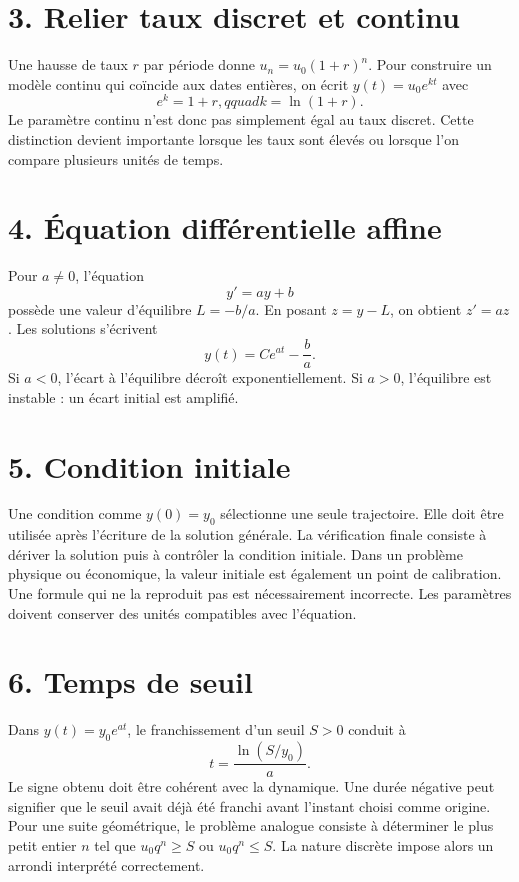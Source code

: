 \section{3. Relier taux discret et continu}
Une hausse de taux $r$ par période donne $u_n=u_0(1+r)^n$. Pour construire un modèle continu qui coïncide aux dates entières, on écrit $y(t)=u_0e^{kt}$ avec
\[
e^k=1+r,qquad k=\ln(1+r).
\]
Le paramètre continu n'est donc pas simplement égal au taux discret. Cette distinction devient importante lorsque les taux sont élevés ou lorsque l'on compare plusieurs unités de temps.
\section{4. Équation différentielle affine}
Pour $a\neq0$, l'équation
\[
y'=ay+b
\]
possède une valeur d'équilibre $L=-b/a$. En posant $z=y-L$, on obtient $z'=az$. Les solutions s'écrivent
\[
y(t)=Ce^{at}-\frac ba.
\]
Si $a<0$, l'écart à l'équilibre décroît exponentiellement. Si $a>0$, l'équilibre est instable : un écart initial est amplifié.
\section{5. Condition initiale}
Une condition comme $y(0)=y_0$ sélectionne une seule trajectoire. Elle doit être utilisée après l'écriture de la solution générale. La vérification finale consiste à dériver la solution puis à contrôler la condition initiale.
Dans un problème physique ou économique, la valeur initiale est également un point de calibration. Une formule qui ne la reproduit pas est nécessairement incorrecte. Les paramètres doivent conserver des unités compatibles avec l'équation.
\section{6. Temps de seuil}
Dans $y(t)=y_0e^{at}$, le franchissement d'un seuil $S>0$ conduit à
\[
t=\frac{\ln(S/y_0)}{a}.
\]
Le signe obtenu doit être cohérent avec la dynamique. Une durée négative peut signifier que le seuil avait déjà été franchi avant l'instant choisi comme origine.
Pour une suite géométrique, le problème analogue consiste à déterminer le plus petit entier $n$ tel que $u_0q^n\geq S$ ou $u_0q^n\leq S$. La nature discrète impose alors un arrondi interprété correctement.
